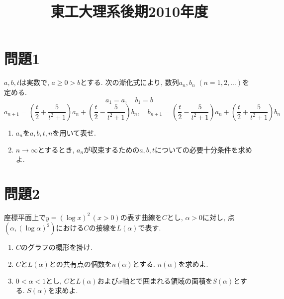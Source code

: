 \documentclass[unicode,12pt, a4paper]{ltjsarticle}%
\title{東工大理系後期2010年度}
\begin{document}
\maketitle
\section{問題1}
$a, b, t$は実数で, $a \ge 0 > b$とする. 次の漸化式により, 数列$a_n, b_n$ $(n=1, 2, \dots)$を定める.
    \[ a_1=a, \quad b_1=b \]
    \[ a_{n+1} = \left(\frac{t}{2} + \frac{5}{t^2+1}\right) a_n + \left(\frac{t}{2} - \frac{5}{t^2+1}\right) b_n, \quad b_{n+1} = \left(\frac{t}{2} - \frac{5}{t^2+1}\right) a_n + \left(\frac{t}{2} + \frac{5}{t^2+1}\right) b_n \]
    \begin{enumerate}
        \item $a_n$を$a, b, t, n$を用いて表せ.
        \item $n \to \infty$とするとき, $a_n$が収束するための$a, b, t$についての必要十分条件を求めよ.
    \end{enumerate}


\section{問題2}
座標平面上で$y = (\log x)^2 \, (x>0)$の表す曲線を$C$とし, $\alpha > 0$に対し, 点$(\alpha, (\log \alpha)^2)$における$C$の接線を$L(\alpha)$で表す.
    \begin{enumerate}
        \item $C$のグラフの概形を掛け.
        \item $C$と$L(\alpha)$との共有点の個数を$n(\alpha)$とする. $n(\alpha)$を求めよ.
        \item $0 < \alpha < 1$とし, $C$と$L(\alpha)$および$x$軸とで囲まれる領域の面積を$S(\alpha)$とする. $S(\alpha)$を求めよ.
    \end{enumerate}
\end{document}
